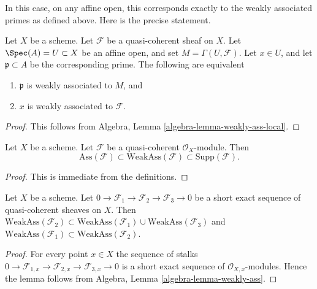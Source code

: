 \noindent
In this case, on any affine open, this corresponds exactly to the
weakly associated primes as defined above. Here is the precise statement.

\begin{lemma}
\label{lemma-weakly-associated-affine-open}
Let $X$ be a scheme. Let $\mathcal{F}$ be a quasi-coherent sheaf on $X$.
Let $\Spec(A) = U \subset X$ be an affine open, and set
$M = \Gamma(U, \mathcal{F})$.
Let $x \in U$, and let $\mathfrak p \subset A$ be the corresponding prime.
The following are equivalent
\begin{enumerate}
\item $\mathfrak p$ is weakly associated to $M$, and
\item $x$ is weakly associated to $\mathcal{F}$.
\end{enumerate}
\end{lemma}

\begin{proof}
This follows from
Algebra, Lemma \ref{algebra-lemma-weakly-ass-local}.
\end{proof}

\begin{lemma}
\label{lemma-weakly-ass-support}
Let $X$ be a scheme.
Let $\mathcal{F}$ be a quasi-coherent $\mathcal{O}_X$-module.
Then
$$
\text{Ass}(\mathcal{F}) \subset \text{WeakAss}(\mathcal{F}) \subset
\text{Supp}(\mathcal{F}).
$$
\end{lemma}

\begin{proof}
This is immediate from the definitions.
\end{proof}

\begin{lemma}
\label{lemma-ses-weakly-ass}
Let $X$ be a scheme.
Let $0 \to \mathcal{F}_1 \to \mathcal{F}_2 \to \mathcal{F}_3 \to 0$
be a short exact sequence of quasi-coherent sheaves on $X$.
Then
$\text{WeakAss}(\mathcal{F}_2) \subset
\text{WeakAss}(\mathcal{F}_1) \cup \text{WeakAss}(\mathcal{F}_3)$
and
$\text{WeakAss}(\mathcal{F}_1) \subset \text{WeakAss}(\mathcal{F}_2)$.
\end{lemma}

\begin{proof}
For every point $x \in X$ the sequence of stalks
$0 \to \mathcal{F}_{1, x} \to \mathcal{F}_{2, x} \to \mathcal{F}_{3, x} \to 0$
is a short exact sequence of $\mathcal{O}_{X, x}$-modules.
Hence the lemma follows from
Algebra, Lemma \ref{algebra-lemma-weakly-ass}.
\end{proof}

